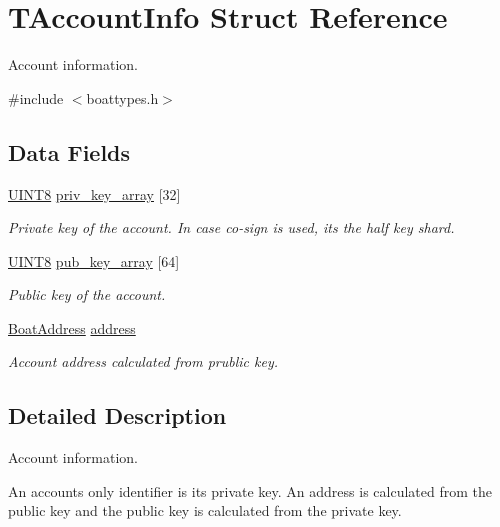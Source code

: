 \hypertarget{struct_t_account_info}{}\section{T\+Account\+Info Struct Reference}
\label{struct_t_account_info}


Account information.  




{\ttfamily \#include $<$boattypes.\+h$>$}

\subsection*{Data Fields}
\begin{DoxyCompactItemize}
\item 
\mbox{\hyperlink{boattypes_8h_ab27e9918b538ce9d8ca692479b375b6a}{U\+I\+N\+T8}} \mbox{\hyperlink{struct_t_account_info_a716d4ef9a25584b692e9f09f82bc3985}{priv\+\_\+key\+\_\+array}} \mbox{[}32\mbox{]}
\begin{DoxyCompactList}\small\item\em Private key of the account. In case co-\/sign is used, it\textquotesingle{}s the half key shard. \end{DoxyCompactList}\item 
\mbox{\hyperlink{boattypes_8h_ab27e9918b538ce9d8ca692479b375b6a}{U\+I\+N\+T8}} \mbox{\hyperlink{struct_t_account_info_aae6e4c3cacff03b34c4165e79679d68b}{pub\+\_\+key\+\_\+array}} \mbox{[}64\mbox{]}
\begin{DoxyCompactList}\small\item\em Public key of the account. \end{DoxyCompactList}\item 
\mbox{\hyperlink{boattypes_8h_a18be901fd00e05c6acdbdbab722c6c58}{Boat\+Address}} \mbox{\hyperlink{struct_t_account_info_a991241987348c45a080e1dff42dccc6c}{address}}
\begin{DoxyCompactList}\small\item\em Account address calculated from prublic key. \end{DoxyCompactList}\end{DoxyCompactItemize}


\subsection{Detailed Description}
Account information. 

An account\textquotesingle{}s only identifier is its private key. An address is calculated from the public key and the public key is calculated from the private key. 

